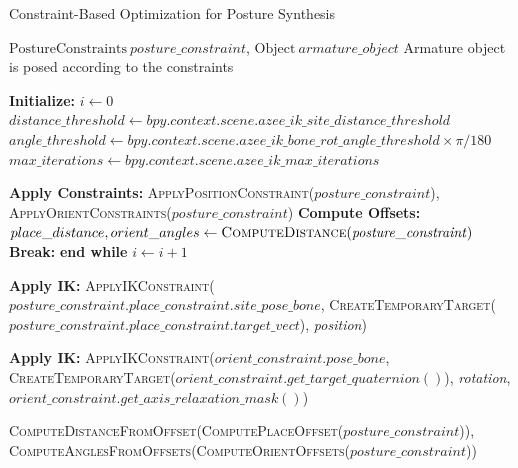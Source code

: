 \documentclass[../../main.tex]{subfiles}
\begin{document}
\begin{algorithm}
    \caption{Constraint-Based Optimization for Posture Synthesis}
    \label{alg:trimmed_constraint_based_optimization}
    \begin{algorithmic}[1]
    \Require $\text{PostureConstraints} \ \mathit{posture\_constraint}$, $\text{Object} \ \mathit{armature\_object}$
    \Ensure Armature object is posed according to the constraints
    
    \State \textbf{Initialize:} $i \gets 0$
    \State $distance\_threshold \gets \mathit{bpy.context.scene.azee\_ik\_site\_distance\_threshold}$
    \State $angle\_threshold \gets \mathit{bpy.context.scene.azee\_ik\_bone\_rot\_angle\_threshold \times \pi / 180}$
    \State $max\_iterations \gets \mathit{bpy.context.scene.azee\_ik\_max\_iterations}$
    
        \State \textbf{Apply Constraints:} \textsc{ApplyPositionConstraint}($\mathit{posture\_constraint}$), \textsc{ApplyOrientConstraints}($\mathit{posture\_constraint}$)
        \State \textbf{Compute Offsets:} $place\_distance, orient\_angles \gets \textsc{ComputeDistance}(\mathit{posture\_constraint})$
            \State \textbf{Break:} \textbf{end while}
        \EndIf
        \State $i \gets i + 1$
    \EndWhile
    
            \State \textbf{Apply IK:} \textsc{ApplyIKConstraint}($\mathit{posture\_constraint.place\_constraint.site\_pose\_bone}$, 
            \textsc{CreateTemporaryTarget}($\mathit{posture\_constraint.place\_constraint.target\_vect}$), \textit{position})
        \EndIf
    \EndProcedure
    
            \State \textbf{Apply IK:} \textsc{ApplyIKConstraint}($orient\_constraint.pose\_bone$, 
            \textsc{CreateTemporaryTarget}($orient\_constraint.get\_target\_quaternion()$), \textit{rotation}, 
            $orient\_constraint.get\_axis\_relaxation\_mask()$)
        \EndFor
    \EndProcedure
    
        \State \Return \textsc{ComputeDistanceFromOffset}(\textsc{ComputePlaceOffset}($\mathit{posture\_constraint}$)), 
        \textsc{ComputeAnglesFromOffsets}(\textsc{ComputeOrientOffsets}($\mathit{posture\_constraint}$))
    \EndProcedure
    \end{algorithmic}
\end{algorithm}
\end{document}

